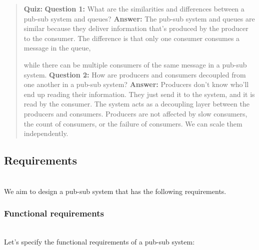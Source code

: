 \begin{quote}
\textbf{Quiz:}
\textbf{Question 1:} What are the similarities and differences between a pub-sub system and queues?
\textbf{Answer:} The pub-sub system and queues are similar because they deliver information that's produced by the producer to the consumer. The difference is that only one consumer consumes a message in the queue,

while there can be multiple consumers of the same message in a pub-sub system.
\textbf{Question 2:} How are producers and consumers decoupled from one another in a pub-sub system?
\textbf{Answer:} Producers don't know who'll end up reading their information. They just send it to the system, and it is read by the consumer. The system acts as a decoupling layer between the producers and consumers. Producers are not affected by slow consumers, the count of consumers, or the failure of consumers. We can scale them independently.
\end{quote}

\subsection{Requirements}\label{UZjUgXZvyZZmintq0wxxh}
\\
We aim to design a pub-sub system that has the following requirements.

\subsubsection{Functional requirements}\label{RaTSUulhCJhquZ9Zz2eqf}
\\
Let's specify the functional requirements of a pub-sub system:

